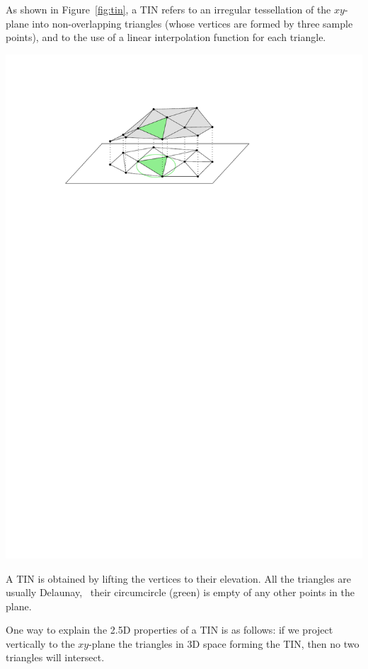 As shown in Figure~\ref{fig:tin}, a TIN refers to an irregular tessellation of the $xy$-plane into non-overlapping triangles (whose vertices are formed by three sample points), and to the use of a linear interpolation function for each triangle. 
\begin{marginfigure}
  \includegraphics{figs/tin}
  \caption{A TIN is obtained by lifting the vertices to their elevation. All the triangles are usually Delaunay, \ie\ their circumcircle (green) is empty of any other points in the plane.}%
\label{fig:tin}
\end{marginfigure}
One way to explain the 2.5D properties of a TIN is as follows: if we project vertically to the $xy$-plane the triangles in 3D space forming the TIN, then no two triangles will intersect.

